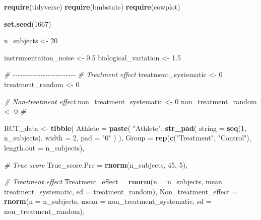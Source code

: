\documentclass[
]{book}
\newenvironment{Shaded}{\begin{snugshade}}{\end{snugshade}}
\newcommand{\CommentTok}[1]{\textcolor[rgb]{0.56,0.35,0.01}{\textit{#1}}}
\newcommand{\DataTypeTok}[1]{\textcolor[rgb]{0.13,0.29,0.53}{#1}}
\newcommand{\DecValTok}[1]{\textcolor[rgb]{0.00,0.00,0.81}{#1}}
\newcommand{\FloatTok}[1]{\textcolor[rgb]{0.00,0.00,0.81}{#1}}
\newcommand{\KeywordTok}[1]{\textcolor[rgb]{0.13,0.29,0.53}{\textbf{#1}}}
\newcommand{\NormalTok}[1]{#1}
\newcommand{\StringTok}[1]{\textcolor[rgb]{0.31,0.60,0.02}{#1}}
\begin{document}
\begin{Shaded}
\begin{Highlighting}[]
\KeywordTok{require}\NormalTok{(tidyverse)}
\KeywordTok{require}\NormalTok{(bmbstats)}
\KeywordTok{require}\NormalTok{(cowplot)}

\KeywordTok{set.seed}\NormalTok{(}\DecValTok{1667}\NormalTok{)}

\NormalTok{n\_subjects <{-}}\StringTok{ }\DecValTok{20}


\NormalTok{instrumentation\_noise <{-}}\StringTok{ }\FloatTok{0.5}
\NormalTok{biological\_variation <{-}}\StringTok{ }\FloatTok{1.5}

\CommentTok{\# {-}{-}{-}{-}{-}{-}{-}{-}{-}{-}{-}{-}{-}{-}{-}{-}{-}{-}{-}{-}{-}{-}{-}{-}{-}}
\CommentTok{\# Treatment effect}
\NormalTok{treatment\_systematic <{-}}\StringTok{ }\DecValTok{0}
\NormalTok{treatment\_random <{-}}\StringTok{ }\DecValTok{0}

\CommentTok{\# Non{-}treatment effect}
\NormalTok{non\_treatment\_systematic <{-}}\StringTok{ }\DecValTok{0}
\NormalTok{non\_treatment\_random <{-}}\StringTok{ }\DecValTok{0}
\CommentTok{\#{-}{-}{-}{-}{-}{-}{-}{-}{-}{-}{-}{-}{-}{-}{-}{-}{-}{-}{-}{-}{-}{-}{-}{-}{-}}

\NormalTok{RCT\_data <{-}}\StringTok{ }\KeywordTok{tibble}\NormalTok{(}
  \DataTypeTok{Athlete =} \KeywordTok{paste}\NormalTok{(}
    \StringTok{"Athlete"}\NormalTok{,}
    \KeywordTok{str\_pad}\NormalTok{(}
      \DataTypeTok{string =} \KeywordTok{seq}\NormalTok{(}\DecValTok{1}\NormalTok{, n\_subjects),}
      \DataTypeTok{width =} \DecValTok{2}\NormalTok{,}
      \DataTypeTok{pad =} \StringTok{"0"}
\NormalTok{    )}
\NormalTok{  ),}
  \DataTypeTok{Group =} \KeywordTok{rep}\NormalTok{(}\KeywordTok{c}\NormalTok{(}\StringTok{"Treatment"}\NormalTok{, }\StringTok{"Control"}\NormalTok{), }\DataTypeTok{length.out =}\NormalTok{ n\_subjects),}

  \CommentTok{\# True score}
  \DataTypeTok{True\_score.Pre =} \KeywordTok{rnorm}\NormalTok{(n\_subjects, }\DecValTok{45}\NormalTok{, }\DecValTok{5}\NormalTok{),}

  \CommentTok{\# Treatment effect}
  \DataTypeTok{Treatment\_effect =} \KeywordTok{rnorm}\NormalTok{(}\DataTypeTok{n =}\NormalTok{ n\_subjects, }\DataTypeTok{mean =}\NormalTok{ treatment\_systematic, }\DataTypeTok{sd =}\NormalTok{ treatment\_random),}
  \DataTypeTok{Non\_treatment\_effect =} \KeywordTok{rnorm}\NormalTok{(}\DataTypeTok{n =}\NormalTok{ n\_subjects, }\DataTypeTok{mean =}\NormalTok{ non\_treatment\_systematic, }\DataTypeTok{sd =}\NormalTok{ non\_treatment\_random),}


\end{Highlighting}
\end{Shaded}
\end{document}

